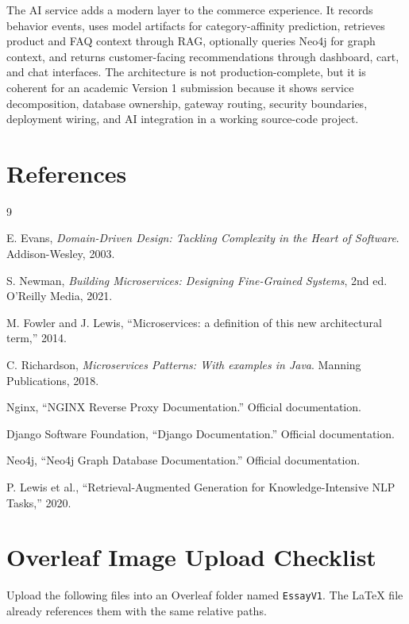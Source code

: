 \documentclass[12pt,a4paper]{article}
\begin{document}
The AI service adds a modern layer to the commerce experience. It records behavior events, uses model artifacts for category-affinity prediction, retrieves product and FAQ context through RAG, optionally queries Neo4j for graph context, and returns customer-facing recommendations through dashboard, cart, and chat interfaces. The architecture is not production-complete, but it is coherent for an academic Version 1 submission because it shows service decomposition, database ownership, gateway routing, security boundaries, deployment wiring, and AI integration in a working source-code project.

\newpage
\section*{References}

\begin{thebibliography}{9}

E. Evans, \textit{Domain-Driven Design: Tackling Complexity in the Heart of Software}. Addison-Wesley, 2003.

S. Newman, \textit{Building Microservices: Designing Fine-Grained Systems}, 2nd ed. O'Reilly Media, 2021.

M. Fowler and J. Lewis, ``Microservices: a definition of this new architectural term,'' 2014.

C. Richardson, \textit{Microservices Patterns: With examples in Java}. Manning Publications, 2018.

Nginx, ``NGINX Reverse Proxy Documentation.'' Official documentation.

Django Software Foundation, ``Django Documentation.'' Official documentation.

Neo4j, ``Neo4j Graph Database Documentation.'' Official documentation.

P. Lewis et al., ``Retrieval-Augmented Generation for Knowledge-Intensive NLP Tasks,'' 2020.

\end{thebibliography}

\newpage
\appendix
\section{Overleaf Image Upload Checklist}

Upload the following files into an Overleaf folder named \texttt{EssayV1}. The LaTeX file already references them with the same relative paths.
\end{document}
